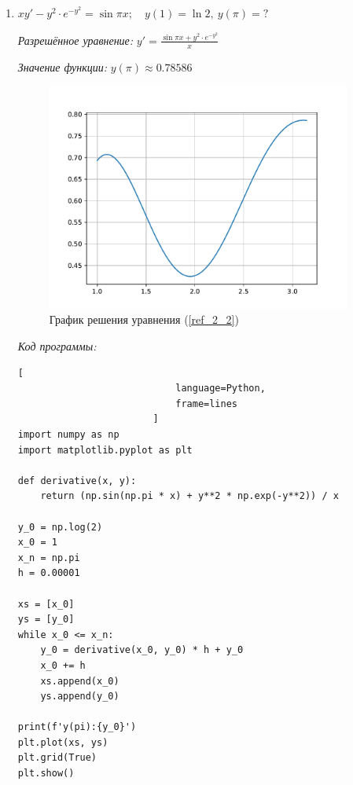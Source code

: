 \documentclass[14pt, titlepage, a4paper, fleqn]{extarticle}
\begin{document}
\begin{enumerate}
\begin{lstlisting}[
                            language=Python,                        
                            frame=lines
                        ]
y_0 = -np.pi / 3
x_0 = 0
x_n = 1
h = 0.00001

xs = [x_0]
ys = [y_0]
while x_0 <= x_n:
    y_0 = derivative(x_0, y_0) * h + y_0
    x_0 += h   
    xs.append(x_0)
    ys.append(y_0)

print(f'y(1):{y_0}')
plt.plot(xs, ys)
plt.grid(True)
plt.show()
                        \end{lstlisting}

                \item \(
                    xy' - y^2 \cdot e^{-y^2} = \sin{\pi x}; \quad y(1) = \ln{2}, 
                    ~ y(\pi) = ?
                \) \label{ref_2_2}

                    \textit{Разрешённое уравнение:}
                        \(\displaystyle y' = \frac{\sin{\pi x} + y^2 \cdot e^{-y^2}}{x}\)

                    \textit{Значение функции:} \(y(\pi) \approx 0.78586\)

                    \begin{figure}[H]
                        \centering
                        \includegraphics[width=10cm]{Figure_2.pdf}
                        \caption{График решения уравнения (\ref{ref_2_2})}
                    \end{figure}

                    \textit{Код программы:}
                        \begin{lstlisting}[
                            language=Python,                        
                            frame=lines
                        ]
import numpy as np
import matplotlib.pyplot as plt

def derivative(x, y):
    return (np.sin(np.pi * x) + y**2 * np.exp(-y**2)) / x

y_0 = np.log(2)
x_0 = 1
x_n = np.pi
h = 0.00001

xs = [x_0]
ys = [y_0]
while x_0 <= x_n:
    y_0 = derivative(x_0, y_0) * h + y_0
    x_0 += h   
    xs.append(x_0)
    ys.append(y_0)

print(f'y(pi):{y_0}')
plt.plot(xs, ys)
plt.grid(True)
plt.show()
                        \end{lstlisting}
                
            \end{enumerate}
   
\end{document}
